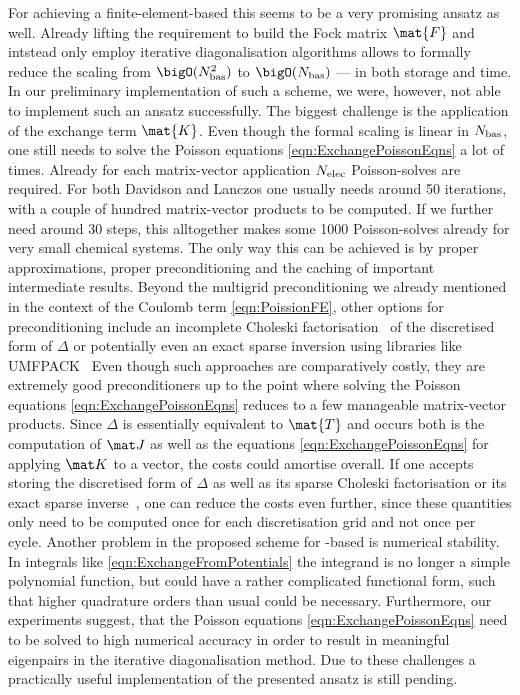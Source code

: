 For achieving a finite-element-based \HF
this seems to be a very promising ansatz as well.
Already lifting the requirement to build the Fock matrix $\mat{F}$
and intstead only employ
iterative diagonalisation algorithms
allows to formally reduce the scaling from $\bigO(\Nbas^2)$ to $\bigO(\Nbas)$
--- in both storage and time.
In our preliminary implementation of such a scheme,
we were, however, not able to implement such an ansatz successfully.
The biggest challenge is
the application of the exchange term $\mat{K}$.
Even though the formal scaling is linear in $N_\text{bas}$,
one still needs to solve the Poisson equations \eqref{eqn:ExchangePoissonEqns}
a lot of times.
Already for each matrix-vector application
$N_\text{elec}$ Poisson-solves are required.
For both Davidson and Lanczos one usually needs around 50 iterations,
with a couple of hundred matrix-vector products to be computed.
If we further need around 30 \SCF steps,
this alltogether makes some 1000 Poisson-solves
already for very small chemical systems.
The only way this can be achieved is by
proper approximations, proper preconditioning and
the caching of important intermediate results.
Beyond the multigrid preconditioning we already mentioned
in the context of the Coulomb term \eqref{eqn:PoissionFE},
other options for preconditioning include
an incomplete Choleski factorisation~\cite{Lin1999}
of the discretised form of $\Delta$
or potentially even an exact sparse inversion
using libraries like UMFPACK~\cite{Davis2004}
Even though such approaches are comparatively costly,
they are extremely good preconditioners up to the point
where solving the Poisson equations \eqref{eqn:ExchangePoissonEqns}
reduces to a few manageable matrix-vector products.
Since $\Delta$ is essentially equivalent to $\mat{T}$
and occurs both is the computation of $\matJ$
as well as the equations \eqref{eqn:ExchangePoissonEqns}
for applying $\matK$ to a vector, the costs could amortise overall.
If one accepts storing the discretised form of $\Delta$
as well as its sparse Choleski factorisation
or its exact sparse inverse~\cite{Davis2004},
one can reduce the costs even further,
since these quantities only need to be computed
once for each discretisation grid and not once per \SCF cycle.
Another problem in the proposed scheme for \FE-based \HF is numerical stability.
In integrals like \eqref{eqn:ExchangeFromPotentials}
the integrand is no longer a simple polynomial function,
but could have a rather complicated functional form,
such that higher quadrature orders than usual
could be necessary.
Furthermore, our experiments suggest,
that the Poisson equations \eqref{eqn:ExchangePoissonEqns}
need to be solved to high numerical accuracy
in order to result in meaningful eigenpairs
in the iterative diagonalisation method.
Due to these challenges a practically useful implementation
of the presented ansatz is still pending.

